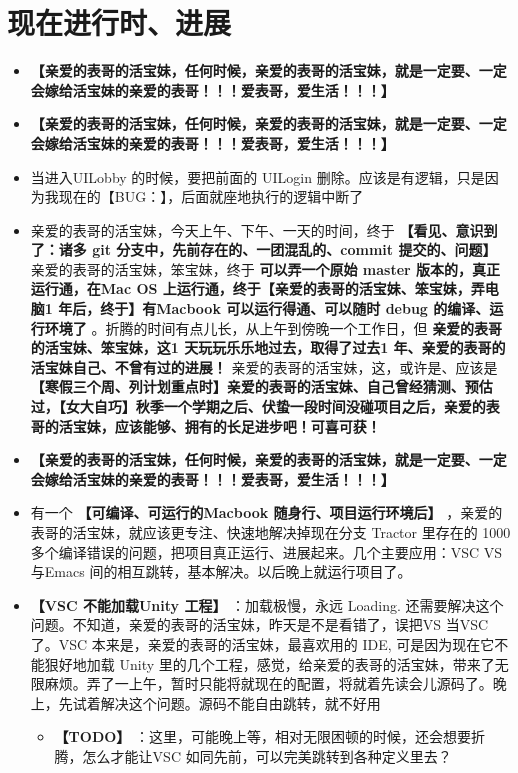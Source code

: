 \documentclass[9pt, b5paper]{article}
\begin{document}
\section{现在进行时、进展}
\label{sec-6}
\begin{itemize}
\item \textbf{【亲爱的表哥的活宝妹，任何时候，亲爱的表哥的活宝妹，就是一定要、一定会嫁给活宝妹的亲爱的表哥！！！爱表哥，爱生活！！！】}
\item \textbf{【亲爱的表哥的活宝妹，任何时候，亲爱的表哥的活宝妹，就是一定要、一定会嫁给活宝妹的亲爱的表哥！！！爱表哥，爱生活！！！】}
\item 当进入UILobby 的时候，要把前面的 UILogin 删除。应该是有逻辑，只是因为我现在的【BUG：】，后面就座地执行的逻辑中断了
\item 亲爱的表哥的活宝妹，今天上午、下午、一天的时间，终于 \textbf{【看见、意识到了：诸多 git 分支中，先前存在的、一团混乱的、commit 提交的、问题】} 亲爱的表哥的活宝妹，笨宝妹，终于 \textbf{可以弄一个原始 master 版本的，真正运行通，在Mac OS 上运行通，终于【亲爱的表哥的活宝妹、笨宝妹，弄电脑1 年后，终于】有Macbook 可以运行得通、可以随时 debug 的编译、运行环境了} 。折腾的时间有点儿长，从上午到傍晚一个工作日，但 \textbf{亲爱的表哥的活宝妹、笨宝妹，这1 天玩玩乐乐地过去，取得了过去1 年、亲爱的表哥的活宝妹自己、不曾有过的进展！} 亲爱的表哥的活宝妹，这，或许是、应该是 \textbf{【寒假三个周、列计划重点时】亲爱的表哥的活宝妹、自己曾经猜测、预估过，【女大自巧】秋季一个学期之后、伏蛰一段时间没碰项目之后，亲爱的表哥的活宝妹，应该能够、拥有的长足进步吧！可喜可获！}
\item \textbf{【亲爱的表哥的活宝妹，任何时候，亲爱的表哥的活宝妹，就是一定要、一定会嫁给活宝妹的亲爱的表哥！！！爱表哥，爱生活！！！】}
\item 有一个 \textbf{【可编译、可运行的Macbook 随身行、项目运行环境后】} ，亲爱的表哥的活宝妹，就应该更专注、快速地解决掉现在分支 Tractor 里存在的 1000 多个编译错误的问题，把项目真正运行、进展起来。几个主要应用：VSC VS 与Emacs 间的相互跳转，基本解决。以后晚上就运行项目了。
\item \textbf{【VSC 不能加载Unity 工程】} ：加载极慢，永远 Loading. 还需要解决这个问题。不知道，亲爱的表哥的活宝妹，昨天是不是看错了，误把VS 当VSC 了。VSC 本来是，亲爱的表哥的活宝妹，最喜欢用的 IDE, 可是因为现在它不能狠好地加载 Unity 里的几个工程，感觉，给亲爱的表哥的活宝妹，带来了无限麻烦。弄了一上午，暂时只能将就现在的配置，将就着先读会儿源码了。晚上，先试着解决这个问题。源码不能自由跳转，就不好用
\begin{itemize}
\item \textbf{【TODO】} ：这里，可能晚上等，相对无限困顿的时候，还会想要折腾，怎么才能让VSC 如同先前，可以完美跳转到各种定义里去？

\end{itemize}
\end{itemize}
\end{document}
